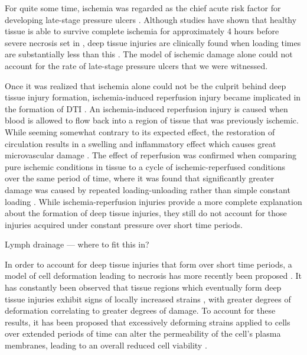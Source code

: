 			For quite some time, ischemia was regarded as the chief acute risk factor for developing late-stage pressure ulcers \cite{witkowski82,dinsdale74,kosiak61}. Although studies have shown that healthy tissue is able to survive complete ischemia for approximately 4 hours before severe necrosis set in \cite{labbe87,strock69}, deep tissue injuries are clinically found when loading times are substantially less than this \cite{aronovitch99,bliss99}. The model of ischemic damage alone could not account for the rate of late-stage pressure ulcers that we were witnessed.

			Once it was realized that ischemia alone could not be the culprit behind deep tissue injury formation, ischemia-induced reperfusion injury became implicated in the formation of DTI \cite{Ytrehus95,Blaisdell02,tsuji05}. An ischemia-induced reperfusion injury is caused when blood is allowed to flow back into a region of tissue that was previously ischemic. While seeming somewhat contrary to its expected effect, the restoration of circulation results in a swelling and inflammatory effect which causes great microvascular damage \cite{Blaisdell02}. The effect of reperfusion was confirmed when comparing pure ischemic conditions in tissue to a cycle of ischemic-reperfused conditions over the same period of time, where it was found that significantly greater damage was caused by repeated loading-unloading rather than simple constant loading \cite{tsuji05}. While ischemia-reperfusion injuries provide a more complete explanation about the formation of deep tissue injuries, they still do not account for those injuries acquired under constant pressure over short time periods.

			Lymph drainage \cite{krouskop78,miller81,reddy81,braden87} --- where to fit this in?

			In order to account for deep tissue injuries that form over short time periods, a model of cell deformation leading to necrosis has more recently been proposed \cite{landsman95,bouten01,wang05}. It has constantly been observed that tissue regions which eventually form deep tissue injuries exhibit signs of locally increased strains \cite{stekelenburg06,ceelen08,linderganz08,portnoy09}, with greater degrees of deformation correlating to greater degrees of damage. To account for these results, it has been proposed that excessively deforming strains applied to cells over extended periods of time can alter the permeability of the cell's plasma membranes, leading to an overall reduced cell viability \cite{slomka12}. 

